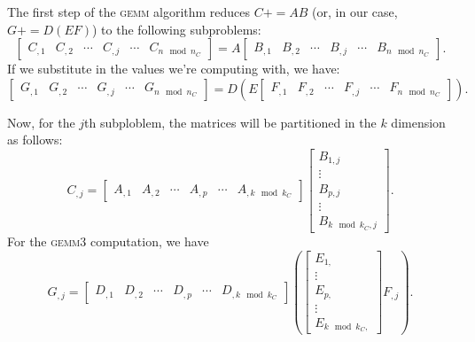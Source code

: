 \documentclass[12pt]{article}
\newcommand*{\pluseq}{\mathrel{{+}{=}}}
\newcommand*{\gemmt}{{\textsc{gemm3}}}
\newcommand*{\gemm}{{\textsc{gemm}}}
\begin{document}
The first step of the \gemm{} algorithm reduces $C \pluseq AB$ (or, in our case, $G \pluseq D(EF)$) to the following subproblems:
\begin{equation*}
  \left[\begin{array}{c|c|c|c|c|c}
    C_{,1}&C_{,2}&\cdots&C_{,j}&\cdots& C_{n \mod n_C}
  \end{array}\right]
  = A
  \left[\begin{array}{c|c|c|c|c|c}
    B_{,1}&B_{,2}&\cdots&B_{,j}&\cdots&B_{n \mod n_C}
  \end{array}\right].
\end{equation*}
If we substitute in the values we're computing with, we have:
\begin{equation*}
  \left[\begin{array}{c|c|c|c|c|c}
    G_{,1}&G_{,2}&\cdots&G_{,j}&\cdots& G_{n \mod n_C}
  \end{array}\right]
  = D\left(
    E
    \left[\begin{array}{c|c|c|c|c|c}
      F_{,1}&F_{,2}&\cdots&F_{,j}&\cdots&F_{n \mod n_C}
    \end{array}\right]
  \right).
\end{equation*}

Now, for the $j$th subploblem, the matrices will be partitioned in the $k$ dimension as follows:
\begin{equation*}
  C_{,j}
  =
  \left[\begin{array}{c|c|c|c|c|c}
    A_{,1}&A_{,2}&\cdots&A_{,p}&\cdots&A_{,k \mod k_C}
  \end{array}\right]
  \left[\begin{array}{c}
    B_{1,j}\\\hline
    \vdots\\\hline
    B_{p,j}\\\hline
    \vdots\\\hline
    B_{k \mod k_C,j}
  \end{array}\right].
\end{equation*}
For the \gemmt{} computation, we have
\begin{equation*}
  G_{,j}
  =
  \left[\begin{array}{c|c|c|c|c|c}
    D_{,1}&D_{,2}&\cdots&D_{,p}&\cdots&D_{,k \mod k_C}
  \end{array}\right]
  \left(
  \left[\begin{array}{c}
          E_{1,}\\\hline
          \vdots\\\hline
          E_{p,}\\\hline
          \vdots\\\hline
          E_{k \mod k_C,}
  \end{array}\right]
  F_{,j}
  \right).
\end{equation*}
\end{document}
